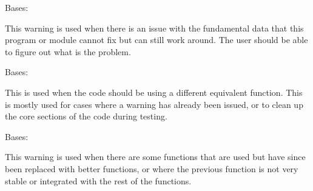 \documentclass[letterpaper,10pt,english]{sphinxmanual}
\begin{document}

\begin{fulllineitems}
\label{\detokenize{python_docstrings/IfA_Smeargle.meta.errors:IfA_Smeargle.meta.errors.DataWarning}}
Bases: {\hyperref[\detokenize{python_docstrings/IfA_Smeargle.meta.errors:IfA_Smeargle.meta.errors.Smeargle_Warning}]{}}

This warning is used when there is an issue with the fundamental data that
this program or module cannot fix but can still work around. The user
should be able to figure out what is the problem.

\end{fulllineitems}


\begin{fulllineitems}
\label{\detokenize{python_docstrings/IfA_Smeargle.meta.errors:IfA_Smeargle.meta.errors.DeprecatedError}}
Bases: {\hyperref[\detokenize{python_docstrings/IfA_Smeargle.meta.errors:IfA_Smeargle.meta.errors.Smeargle_BaseException}]{}}

This is used when the code should be using a different equivalent function.
This is mostly used for cases where a warning has already been issued, or
to clean up the core sections of the code during testing.

\end{fulllineitems}


\begin{fulllineitems}
\label{\detokenize{python_docstrings/IfA_Smeargle.meta.errors:IfA_Smeargle.meta.errors.DeprecatedWarning}}
Bases: {\hyperref[\detokenize{python_docstrings/IfA_Smeargle.meta.errors:IfA_Smeargle.meta.errors.Smeargle_Warning}]{}}

This warning is used when there are some functions that are used but
have since been replaced with better functions, or where the previous
function is not very stable or integrated with the rest of the functions.

\end{fulllineitems}
\end{document}
